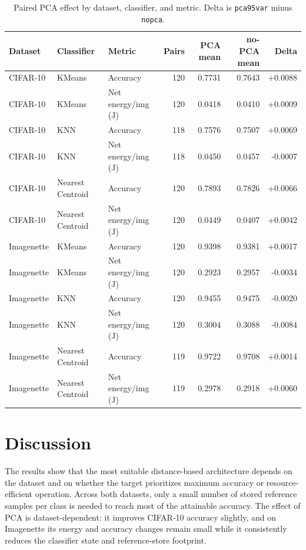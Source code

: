 \documentclass[sigconf,review,nonacm]{acmart}
\begin{document}
\begin{table}[t]
  \caption{Paired PCA effect by dataset, classifier, and metric. Delta is \texttt{pca95var} minus \texttt{nopca}.}
  \label{tab:pca-effect}
  \centering
  \footnotesize
  \begin{tabular}{@{}lllrrrr@{}}
    \toprule
    Dataset & Classifier & Metric & Pairs & PCA mean & no-PCA mean & Delta \\
    \midrule
    CIFAR-10 & KMeans & Accuracy & 120 & 0.7731 & 0.7643 & +0.0088 \\
    CIFAR-10 & KMeans & Net energy/img (J) & 120 & 0.0418 & 0.0410 & +0.0009 \\
    CIFAR-10 & KNN & Accuracy & 118 & 0.7576 & 0.7507 & +0.0069 \\
    CIFAR-10 & KNN & Net energy/img (J) & 118 & 0.0450 & 0.0457 & -0.0007 \\
    CIFAR-10 & Nearest Centroid & Accuracy & 120 & 0.7893 & 0.7826 & +0.0066 \\
    CIFAR-10 & Nearest Centroid & Net energy/img (J) & 120 & 0.0449 & 0.0407 & +0.0042 \\
    Imagenette & KMeans & Accuracy & 120 & 0.9398 & 0.9381 & +0.0017 \\
    Imagenette & KMeans & Net energy/img (J) & 120 & 0.2923 & 0.2957 & -0.0034 \\
    Imagenette & KNN & Accuracy & 120 & 0.9455 & 0.9475 & -0.0020 \\
    Imagenette & KNN & Net energy/img (J) & 120 & 0.3004 & 0.3088 & -0.0084 \\
    Imagenette & Nearest Centroid & Accuracy & 119 & 0.9722 & 0.9708 & +0.0014 \\
    Imagenette & Nearest Centroid & Net energy/img (J) & 119 & 0.2978 & 0.2918 & +0.0060 \\
    \bottomrule
  \end{tabular}
\end{table}

\section{Discussion}
\label{sec:discussion}
The results show that the most suitable distance-based architecture depends on the dataset and on whether the target prioritizes maximum accuracy or resource-efficient operation.
Across both datasets, only a small number of stored reference samples per class is needed to reach most of the attainable accuracy.
The effect of PCA is dataset-dependent: it improves CIFAR-10 accuracy slightly, and on Imagenette its energy and accuracy changes remain small while it consistently reduces the classifier state and reference-store footprint.
\end{document}
